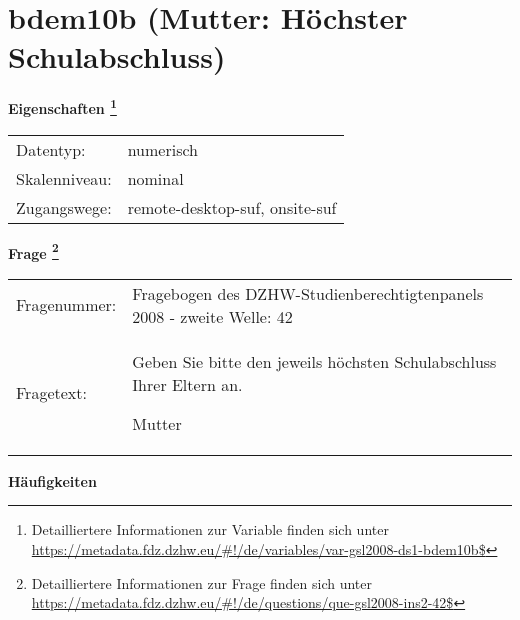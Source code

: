 
    \setcounter{footnote}{0}

    \vspace*{-1.8cm}
	\section{bdem10b (Mutter: Höchster Schulabschluss)}
	\label{section:bdem10b}



    \vspace*{0.5cm}
    \noindent\textbf{Eigenschaften
	\footnote{Detailliertere Informationen zur Variable finden sich unter
		\url{https://metadata.fdz.dzhw.eu/\#!/de/variables/var-gsl2008-ds1-bdem10b$}}}\\
	\begin{tabularx}{\hsize}{@{}lX}
	Datentyp: & numerisch \\
	Skalenniveau: & nominal \\
	Zugangswege: &
	  remote-desktop-suf, 
	  onsite-suf
 \\
    \end{tabularx}



				\vspace*{0.5cm}
                \noindent\textbf{Frage
	                \footnote{Detailliertere Informationen zur Frage finden sich unter
		              \url{https://metadata.fdz.dzhw.eu/\#!/de/questions/que-gsl2008-ins2-42$}}}\\
				\begin{tabularx}{\hsize}{@{}lX}
					Fragenummer: &
					  Fragebogen des DZHW-Studienberechtigtenpanels 2008 - zweite Welle:
					  42
 \\
					Fragetext: & Geben Sie bitte den jeweils höchsten Schulabschluss Ihrer Eltern an.\par  Mutter \\
				\end{tabularx}





        		\vspace*{0.5cm}
                \noindent\textbf{Häufigkeiten}

